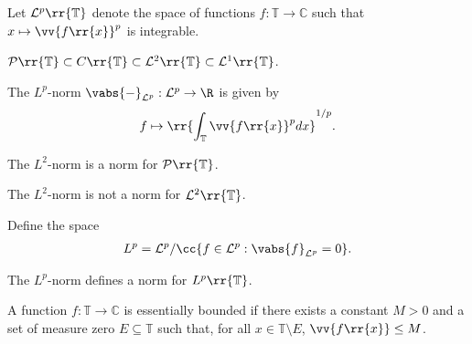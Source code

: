 \documentclass{article}
\begin{document}
\begin{definition}
  Let $\mathcal L^p\rr{\mathbb T}$ denote the space of functions
  $f:\mathbb T\to\mathbb C$ such that $x\mapsto\vv{f\rr{x}}^p$ is integrable.
\end{definition}

\begin{lemma}
  $\mathcal P\rr{\mathbb T}\subset C\rr{\mathbb T}\subset \mathcal L^2\rr{\mathbb T}\subset\mathcal L^1\rr{\mathbb T}$.
\end{lemma}

\begin{definition}
  The $L^p$-norm $\vabs{-}_{\mathcal L^p}:\mathcal L^p\to\R$ is given by
  \begin{align*}
    f \mapsto \rr{\int_{\mathbb T} \vv{f\rr{x}}^p dx}^{1/p}.
  \end{align*}
\end{definition}

\begin{theorem}
  The $L^2$-norm is a norm for $\mathcal P\rr{\mathbb T}$.
\end{theorem}

\begin{theorem}
  The $L^2$-norm is not a norm for $\mathcal L^2\rr{\mathbb T}$.
\end{theorem}

\begin{definition}
  Define the space
  \begin{align*}
    L^p = \mathcal L^p / \cc{f\in\mathcal L^p : \vabs{f}_{\mathcal L^p} = 0}.
  \end{align*}
\end{definition}

\begin{theorem}
  The $L^p$-norm defines a norm for $L^p\rr{\mathbb T}$.
\end{theorem}

\begin{definition}
  A function $f:\mathbb T\to\mathbb C$ is essentially bounded if there exists a constant
  $M>0$ and a set of measure zero $E\subseteq\mathbb T$ such that, for all
  $x\in\mathbb T\setminus E$, $\vv{f\rr{x}}\leq M$.
\end{definition}
\end{document}

